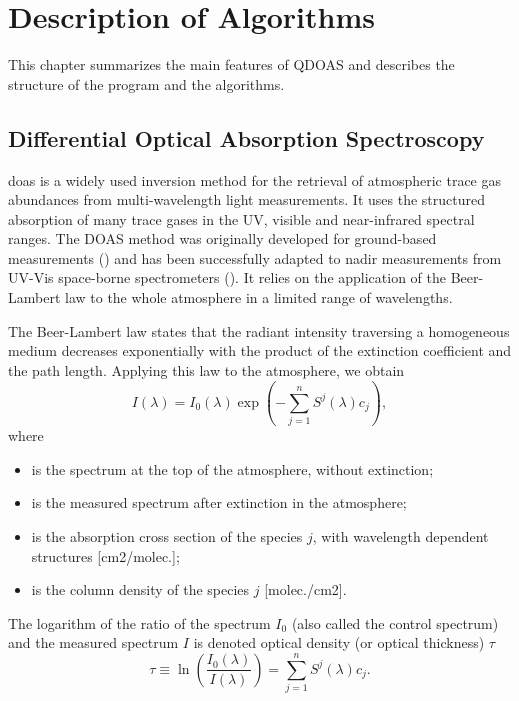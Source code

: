 \chapter{Description of Algorithms}\label{cha:descr-algor}
This chapter summarizes the main features of QDOAS and describes the
structure of the program and the algorithms.

\section{Differential Optical Absorption Spectroscopy}\label{sec:diff-optic-absorpt}
\gls{doas} is a widely used inversion method for the retrieval of
atmospheric trace gas abundances from multi-wavelength light
measurements.  It uses the structured absorption of many trace gases
in the UV, visible and near-infrared spectral ranges. The DOAS method
was originally developed for ground-based measurements
(\citet{platt1994,platt_2008}) and has been successfully adapted to
nadir measurements from UV-Vis space-borne spectrometers
(\citet{sciamachy}). It relies on the application of the Beer-Lambert
law to the whole atmosphere in a limited range of wavelengths.

The Beer-Lambert law states that the radiant intensity traversing a
homogeneous medium decreases exponentially with the product of the
extinction coefficient and the path length.  Applying this law to the
atmosphere, we obtain
\begin{equation}\label{eq:beer-lambert}
  I(\lambda)= I_0(\lambda)\exp \left( -\sum_{j=1}^{n} S^j(\lambda) c_j\right),
\end{equation}
where
\begin{itemize}
\item[$I_0$] is the spectrum at the top of the atmosphere, without extinction;
\item[$I$] is the measured spectrum after extinction in the atmosphere;
\item[$S^j$] is the absorption cross section of the species $j$, with
  wavelength dependent structures [cm2/molec.];
\item[$c_j$] is the column density of the species $j$ [molec./cm2].
\end{itemize}
The logarithm of the ratio of the spectrum $I_0$ (also called the
control spectrum) and the measured spectrum $I$ is denoted optical
density (or optical thickness) $\tau$
\begin{equation}\label{eq:optical_density}
\tau  \equiv \ln\left( \frac{I_0(\lambda)}{I(\lambda)}\right)= \sum_{j=1}^n S^j(\lambda) c_j .
\end{equation}


